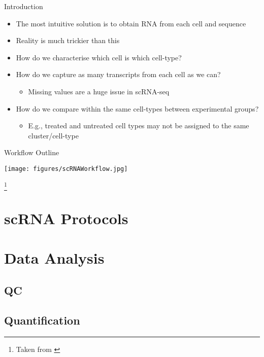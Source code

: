 \documentclass[aspectratio=169,11pt]{beamer}
\newcommand\blfootnote[1]{%
  \begingroup
  \renewcommand\thefootnote{}\footnote{#1}%
  \addtocounter{footnote}{-1}%
  \endgroup
}
\begin{document}
\begin{frame}{Introduction}

	\begin{itemize}
		\item The most intuitive solution is to obtain RNA from each cell and sequence
		\item Reality is much trickier than this
		\pause
		\item How do we characterise which cell is which cell-type?
		\item How do we capture as many transcripts from each cell as we can?
		\begin{itemize}
			\item Missing values are a huge issue in scRNA-seq
		\end{itemize}
		\item How do we compare within the same cell-types between experimental groups?
		\begin{itemize}
			\item E.g., treated and untreated cell types may not be assigned to the same cluster/cell-type
		\end{itemize}
	\end{itemize}

\end{frame}


\begin{frame}{Workflow Outline}

	\begin{center}
	\texttt{[image: figures/scRNAWorkflow.jpg]} 
	\end{center}
	
	\blfootnote{Taken from \cite{10.3389/fgene.2019.00317}}

\end{frame}

\section{scRNA Protocols}

\section{Data Analysis}

\subsection{QC}

\subsection{Quantification}
\end{document}
